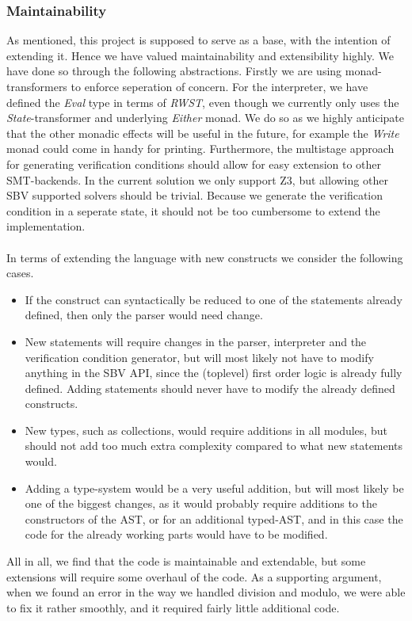 \subsubsection{Maintainability}
As mentioned, this project is supposed to serve as a base, with the intention of extending it.
Hence we have valued maintainability and extensibility highly.
We have done so through the following abstractions.
Firstly we are using monad-transformers to enforce seperation of concern.
For the interpreter, we have defined the \textit{Eval} type in terms of \textit{RWST}, even though we currently only uses the \textit{State}-transformer and underlying \textit{Either} monad.
We do so as we highly anticipate that the other monadic effects will be useful in the future, for example the \textit{Write} monad could come in handy for printing.
Furthermore, the multistage approach for generating verification conditions should allow for easy extension to other SMT-backends.
In the current solution we only support Z3, but allowing other SBV supported solvers should be trivial.
Because we generate the verification condition in a seperate state, it should not be too cumbersome to extend the implementation.
\\~\\
In terms of extending the language with new constructs we consider the following cases.
\begin{itemize}
  \item If the construct can syntactically be reduced to one of the statements already defined, then only the parser would need change.
  \item New statements will require changes in the parser, interpreter and the verification condition generator, but will most likely not have to modify anything in the SBV API, since the (toplevel) first order logic is already fully defined.
  Adding statements should never have to modify the already defined constructs.
  \item New types, such as collections, would require additions in all modules, but should not add too much extra complexity compared to what new statements would.
  \item Adding a type-system would be a very useful addition, but will most likely be one of the biggest changes, as it would probably require additions to the constructors of the AST, or for an additional typed-AST, and in this case the code for the already working parts would have to be modified.
\end{itemize}
All in all, we find that the code is maintainable and extendable, but some extensions will require some overhaul of the code. 
As a supporting argument, when we found an error in the way we handled division and modulo, we were able to fix it rather smoothly, and it required fairly little additional code.

